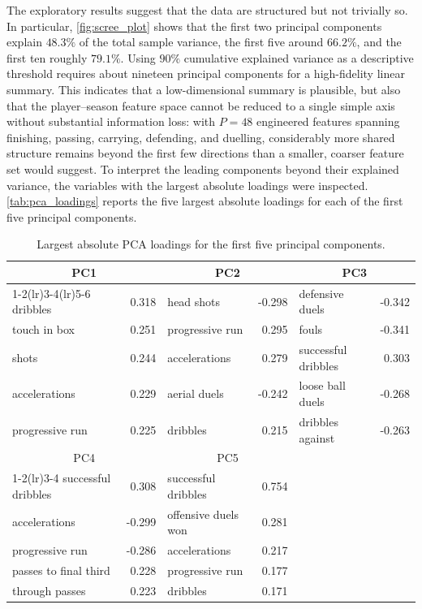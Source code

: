 The exploratory results suggest that the data are structured but not trivially so. In particular, \autoref{fig:scree_plot} shows that the first two principal components explain \(48.3\%\) of the total sample variance, the first five around \(66.2\%\), and the first ten roughly \(79.1\%\). Using \(90\%\) cumulative explained variance as a descriptive threshold requires about nineteen principal components for a high-fidelity linear summary. This indicates that a low-dimensional summary is plausible, but also that the player--season feature space cannot be reduced to a single simple axis without substantial information loss: with \(P=48\) engineered features spanning finishing, passing, carrying, defending, and duelling, considerably more shared structure remains beyond the first few directions than a smaller, coarser feature set would suggest. To interpret the leading components beyond their explained variance, the variables with the largest absolute loadings were inspected. \autoref{tab:pca_loadings} reports the five largest absolute loadings for each of the first five principal components.

\begin{table}[h]
\centering
\caption{Largest absolute PCA loadings for the first five principal components.}
\label{tab:pca_loadings}
\small
\begin{tabular}{lr@{\hspace{1.3em}}lr@{\hspace{1.3em}}lr}
\toprule
\multicolumn{2}{c}{PC1} & \multicolumn{2}{c}{PC2} & \multicolumn{2}{c}{PC3} \\
\cmidrule(lr){1-2}\cmidrule(lr){3-4}\cmidrule(lr){5-6}
dribbles          &  0.318 & head shots       & -0.298 & defensive duels    & -0.342 \\
touch in box      &  0.251 & progressive run  &  0.295 & fouls              & -0.341 \\
shots             &  0.244 & accelerations    &  0.279 & successful dribbles&  0.303 \\
accelerations     &  0.229 & aerial duels     & -0.242 & loose ball duels   & -0.268 \\
progressive run   &  0.225 & dribbles         &  0.215 & dribbles against   & -0.263 \\
\midrule
\multicolumn{2}{c}{PC4} & \multicolumn{2}{c}{PC5} & & \\
\cmidrule(lr){1-2}\cmidrule(lr){3-4}
successful dribbles    &  0.308 & successful dribbles  &  0.754 & & \\
accelerations          & -0.299 & offensive duels won  &  0.281 & & \\
progressive run        & -0.286 & accelerations        &  0.217 & & \\
passes to final third  &  0.228 & progressive run      &  0.177 & & \\
through passes         &  0.223 & dribbles             &  0.171 & & \\
\bottomrule
\end{tabular}
\end{table}

